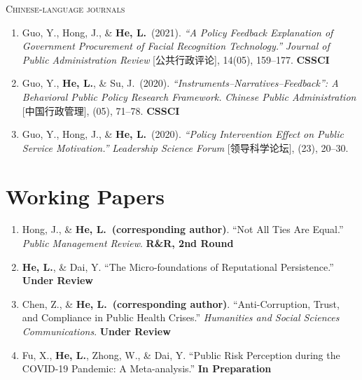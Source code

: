 \documentclass[10pt, a4paper]{article}
\begin{document}
\vspace{4pt}
{\color{accent}\scshape Chinese-language journals}
\vspace{4pt}

\begin{enumerate}[leftmargin=2em, itemsep=6pt, resume]
  \item Guo, Y., Hong, J., \& \textbf{He, L.}\ (2021).
    \textit{``A Policy Feedback Explanation of Government Procurement of Facial Recognition Technology.''}
    \textit{Journal of Public Administration Review} [公共行政评论], 14(05), 159--177.
    \hfill {\color{soft}\textbf{CSSCI}}

  \item Guo, Y., \textbf{He, L.}, \& Su, J.\ (2020).
    \textit{``Instruments--Narratives--Feedback'': A Behavioral Public Policy Research Framework.}
    \textit{Chinese Public Administration} [中国行政管理], (05), 71--78.
    \hfill {\color{soft}\textbf{CSSCI}}

  \item Guo, Y., Hong, J., \& \textbf{He, L.}\ (2020).
    \textit{``Policy Intervention Effect on Public Service Motivation.''}
    \textit{Leadership Science Forum} [领导科学论坛], (23), 20--30.
\end{enumerate}

\section{Working Papers}

\begin{enumerate}[leftmargin=2em, itemsep=5pt]
  \item Hong, J., \& \textbf{He, L.\ (corresponding author)}.
    ``Not All Ties Are Equal.'' \textit{Public Management Review}.
    \hfill {\color{soft}\textbf{R\&R, 2nd Round}}

  \item \textbf{He, L.}, \& Dai, Y.
    ``The Micro-foundations of Reputational Persistence.''
    \hfill {\color{soft}\textbf{Under Review}}

  \item Chen, Z., \& \textbf{He, L.\ (corresponding author)}.
    ``Anti-Corruption, Trust, and Compliance in Public Health Crises.''
    \textit{Humanities and Social Sciences Communications}.
    \hfill {\color{soft}\textbf{Under Review}}

  \item Fu, X., \textbf{He, L.}, Zhong, W., \& Dai, Y.
    ``Public Risk Perception during the COVID-19 Pandemic: A Meta-analysis.''
    \hfill {\color{soft}\textbf{In Preparation}}
\end{enumerate}
\end{document}
